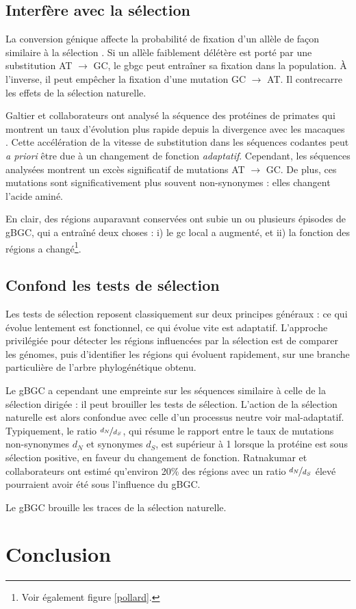 \documentclass[11pt, oneside]{scrartcl}
\begin{document}
\subsection{Interfère avec la sélection}
\label{sec:orgheadline15}
La conversion génique affecte la probabilité de fixation d'un allèle de façon
similaire à la sélection \cite{nagylaki_evolution_1983}. Si un allèle faiblement
délétère est porté par une substitution AT \(\rightarrow\) GC, le \ac{gbgc} peut
entraîner sa fixation dans la population. À l'inverse, il peut empêcher la
fixation d'une mutation GC \(\rightarrow\) AT. Il contrecarre les effets de la
sélection naturelle.

Galtier et collaborateurs ont analysé la séquence des protéines de primates qui
montrent un taux d'évolution plus rapide depuis la divergence avec les macaques
\cite{galtier_gc-biased_2009}. Cette accélération de la vitesse de substitution
dans les séquences codantes peut \emph{a priori} être due à un changement de fonction
\emph{adaptatif}. Cependant, les séquences analysées montrent un excès significatif
de mutations AT \(\rightarrow\) GC. De plus, ces mutations sont significativement
plus souvent non-synonymes : elles changent l'acide aminé.

En clair, des régions auparavant conservées ont subie un ou plusieurs épisodes
de gBGC, qui a entraîné deux choses : i) le \ac{gc} local a augmenté, et ii) la
fonction des régions a changé\footnote{Voir également figure \ref{pollard}.}.

\subsection{Confond les tests de sélection}
\label{sec:orgheadline16}
Les tests de sélection reposent classiquement sur deux principes généraux
\cite{hurst_genetics_2009} : ce qui évolue lentement est fonctionnel, ce qui
évolue vite est adaptatif. L'approche privilégiée pour détecter les régions
influencées par la sélection est de comparer les génomes, puis d'identifier les
régions qui évoluent rapidement, sur une branche particulière de l'arbre
phylogénétique obtenu\cite{ratnakumar_detecting_2010}.

Le gBGC a cependant une empreinte sur les séquences similaire à celle de la
sélection dirigée : il peut brouiller les tests de sélection. L'action de la
sélection naturelle est alors confondue avec celle d'un processus neutre voir
mal-adaptatif. Typiquement, le ratio \(\nicefrac{d_N}{d_S}\), qui résume le
rapport entre le taux de mutations non-synonymes \(d_N\) et synonymes \(d_S\), est
supérieur à 1 lorsque la protéine est sous sélection positive, en faveur du
changement de fonction. Ratnakumar et collaborateurs ont estimé qu'environ 20\%
des régions avec un ratio \(\nicefrac{d_N}{d_S}\) élevé pourraient avoir été sous
l'influence du gBGC. 

Le gBGC brouille les traces de la sélection naturelle.  
\section*{Conclusion}
\label{sec:orgheadline18}

\end{document}
